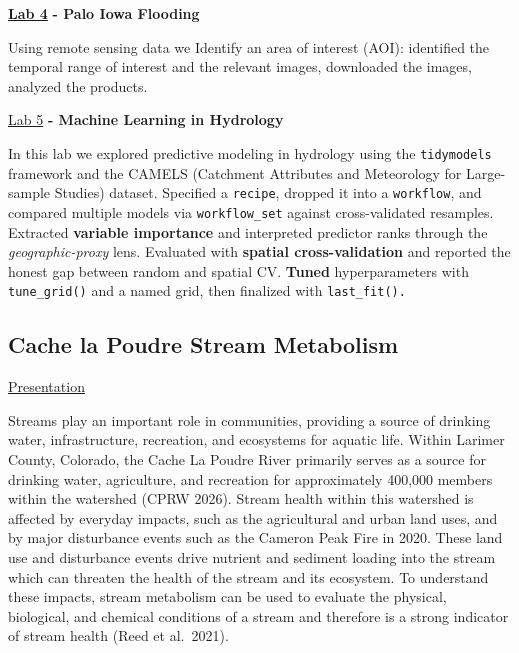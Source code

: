 \documentclass[
  letterpaper,
  DIV=11,
  numbers=noendperiod]{scrartcl}
\begin{document}
\href{https://mrouin.github.io/csu-523c/lab-04-clean.html}{\textbf{Lab
4}} \textbf{- Palo Iowa Flooding}

Using remote sensing data we Identify an area of interest (AOI):
identified the temporal range of interest and the relevant images,
downloaded the images, analyzed the products.

\href{https://mrouin.github.io/csu-523c/lab-05-clean.html}{Lab 5}
\textbf{- Machine Learning in Hydrology}

In this lab we explored predictive modeling in hydrology using the
\texttt{tidymodels} framework and the CAMELS (Catchment Attributes and
Meteorology for Large-sample Studies) dataset. Specified a
\texttt{recipe}, dropped it into a \texttt{workflow}, and compared
multiple models via \texttt{workflow\_set} against cross-validated
resamples. Extracted \textbf{variable importance} and interpreted
predictor ranks through the \emph{geographic-proxy} lens. Evaluated with
\textbf{spatial cross-validation} and reported the honest gap between
random and spatial CV. \textbf{Tuned} hyperparameters with
\texttt{tune\_grid()} and a named grid, then finalized with
\texttt{last\_fit().}

\subsection{Cache la Poudre Stream
Metabolism}\label{cache-la-poudre-stream-metabolism}

\href{GitHub/mrouin/WR696\%20-\%20Project\%20Presentation.pdf}{Presentation}

Streams play an important role in communities, providing a source of
drinking water, infrastructure, recreation, and ecosystems for aquatic
life. Within Larimer County, Colorado, the Cache La Poudre River
primarily serves as a source for drinking water, agriculture, and
recreation for approximately 400,000 members within the watershed (CPRW
2026). Stream health within this watershed is affected by everyday
impacts, such as the agricultural and urban land uses, and by major
disturbance events such as the Cameron Peak Fire in 2020. These land use
and disturbance events drive nutrient and sediment loading into the
stream which can threaten the health of the stream and its ecosystem. To
understand these impacts, stream metabolism can be used to evaluate the
physical, biological, and chemical conditions of a stream and therefore
is a strong indicator of stream health (Reed et al.~2021).
\end{document}
